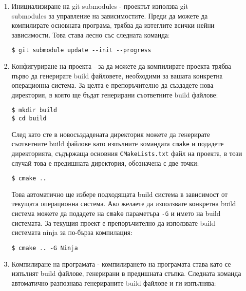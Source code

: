 \begin{enumerate}
    \item Инициализиране на git submodules - проектът използва git \\
          submodules за управление на зависимостите. Преди да можете да
          компилирате основната програма, трябва да изтеглите всички нейни
          зависимости. Това става лесно със следната команда:
    
\begin{lstlisting}[style=shell]
$ git submodule update --init --progress
\end{lstlisting}

    \item Конфигуриране на проекта - за да можете да компилирате проекта трябва
          първо да генерирате build файловете, необходими за вашата конкретна
          операционна система. За целта е препоръчително да създадете нова
          директория, в която ще бъдат генерирани съответните build файлове:

\begin{lstlisting}[style=shell]
$ mkdir build
$ cd build
\end{lstlisting}

След като сте в новосъздадената директория можете да генерирате съответните
build файлове като изпълните командата \texttt{cmake} и подадете директорията,
съдържаща основния \texttt{CMakeLists.txt} файл на проекта, в този случай това
е предишната директория, обозначена с две точки:

\begin{lstlisting}[style=shell]
$ cmake ..
\end{lstlisting}

Това автоматично ще избере подходящата build система в зависимост от текущата
операционна система. Ако желаете да използвате конкретна build система можете да
подадете на \texttt{cmake} параметъра \texttt{-G} и името на build системата. За
текущия проект е препоръчително да използвате build системата ninja за по-бърза
компилация:

\begin{lstlisting}[style=shell]
$ cmake .. -G Ninja
\end{lstlisting}

    \item Компилиране на програмата - компилирането на програмата става като се
          изпълнят build файлове, генерирани в предишната стъпка. Следната
          команда автоматично разпознава генерираните build файлове и ги
          изпълнява:


\end{enumerate}
